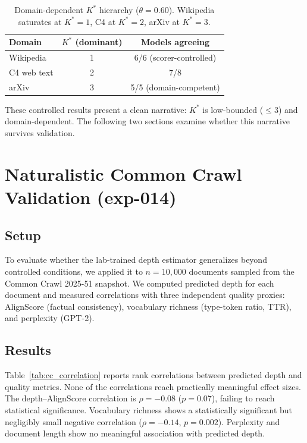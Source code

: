 \documentclass[11pt,a4paper]{article}
\begin{document}
\begin{table}[t]
\centering
\caption{Domain-dependent $K^*$ hierarchy ($\theta = 0.60$). Wikipedia saturates at $K^*=1$, C4 at $K^*=2$, arXiv at $K^*=3$.}
\label{tab:domain_kstar}
\small
\begin{tabular}{@{}lcc@{}}
\toprule
Domain & $K^*$ (dominant) & Models agreeing \\
\midrule
Wikipedia  & 1 & 6/6 (scorer-controlled) \\
C4 web text & 2 & 7/8 \\
arXiv      & 3 & 5/5 (domain-competent) \\
\bottomrule
\end{tabular}
\end{table}

These controlled results present a clean narrative: $K^*$ is low-bounded ($\leq 3$) and domain-dependent.
The following two sections examine whether this narrative survives validation.


\section{Naturalistic Common Crawl Validation (exp-014)}

\subsection{Setup}

To evaluate whether the lab-trained depth estimator generalizes beyond controlled conditions, we applied it to $n = 10{,}000$ documents sampled from the Common Crawl 2025-51 snapshot.
We computed predicted depth for each document and measured correlations with three independent quality proxies: AlignScore (factual consistency), vocabulary richness (type-token ratio, TTR), and perplexity (GPT-2).

\subsection{Results}

Table~\ref{tab:cc_correlation} reports rank correlations between predicted depth and quality metrics.
None of the correlations reach practically meaningful effect sizes.
The depth--AlignScore correlation is $\rho = -0.08$ ($p = 0.07$), failing to reach statistical significance.
Vocabulary richness shows a statistically significant but negligibly small negative correlation ($\rho = -0.14$, $p = 0.002$).
Perplexity and document length show no meaningful association with predicted depth.
\end{document}
